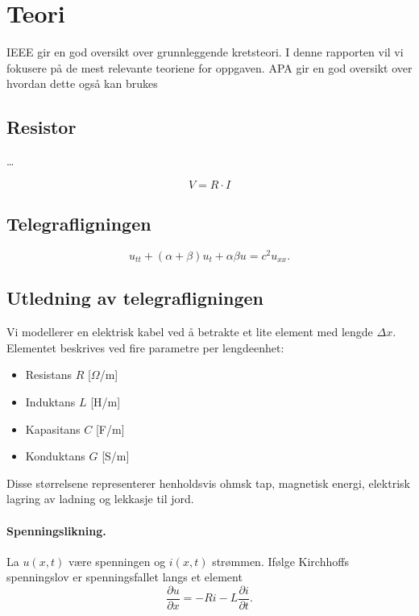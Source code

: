 \section{Teori}
IEEE \parencite{ieeeGuide} gir en god oversikt over grunnleggende kretsteori. 
I denne rapporten vil vi fokusere på de mest relevante teoriene for oppgaven. 
APA\cite{apaGuide} gir en god oversikt over hvordan dette også kan brukes

\subsection{Resistor}
\dots

\begin{equation}
V = R \cdot I
\end{equation}

\subsection{Telegrafligningen}
\begin{equation}
u_{tt} + (\alpha + \beta) u_t + \alpha \beta u = c^2 u_{xx}.
\end{equation}

\subsection{Utledning av telegrafligningen}

Vi modellerer en elektrisk kabel ved å betrakte et lite element med lengde $\Delta x$. Elementet beskrives ved fire parametre per lengdeenhet:  
\begin{itemize}
    \item Resistans $R$ [$\Omega$/m]  
    \item Induktans $L$ [H/m]  
    \item Kapasitans $C$ [F/m]  
    \item Konduktans $G$ [S/m]  
\end{itemize}

Disse størrelsene representerer henholdsvis ohmsk tap, magnetisk energi, elektrisk lagring av ladning og lekkasje til jord.  

\paragraph{Spenningslikning.}  
La $u(x,t)$ være spenningen og $i(x,t)$ strømmen. Ifølge Kirchhoffs spenningslov er spenningsfallet langs et element
\begin{equation}
\frac{\partial u}{\partial x} = -R i - L \frac{\partial i}{\partial t}.
\end{equation}

